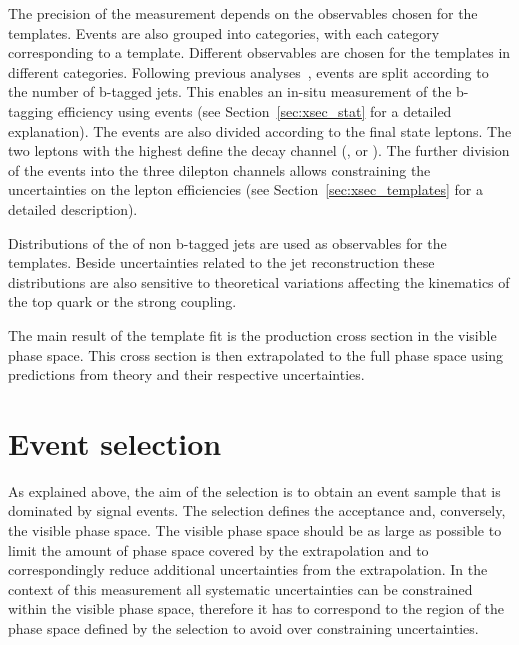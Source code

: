 The precision of the measurement depends on the observables chosen for the templates. Events are also grouped into categories, with each category corresponding to a template. Different observables are chosen for the templates in different categories.
Following previous analyses~\cite{Khachatryan:2016mqs}, events are split according to the number of b-tagged jets. This enables an in-situ measurement of the b-tagging efficiency using \ttbar events (see Section~\ref{sec:xsec_stat} for a detailed explanation).
The events are also divided according to the final state leptons. The two leptons with the highest \pt define the decay channel (\emu, \mumu or \ee). The further division of the events into the three dilepton channels
allows constraining the uncertainties on the lepton efficiencies (see Section~\ref{sec:xsec_templates} for a detailed description).

Distributions of the \pt of non b-tagged jets are used as observables for the templates. Beside uncertainties related to the jet reconstruction these distributions are also sensitive to theoretical variations affecting the kinematics of the top quark or the strong coupling.

The main result of the template fit is the \ttbar production cross section in the visible phase space. This cross section is then extrapolated to the full phase space using predictions from theory and their
respective uncertainties.

\section{Event selection}
\label{sec:xsec_sel}

As explained above, the aim of the selection is to obtain an event sample that is dominated by signal events. The selection defines the acceptance and, conversely, the visible phase space. 
The visible phase space should be as large as possible to limit the amount of phase space covered by the extrapolation and to correspondingly reduce additional uncertainties from the extrapolation. 
In the context of this measurement all systematic uncertainties can be constrained within the visible phase space, therefore it has to correspond to the region of the phase space defined by the selection to avoid over constraining
uncertainties. 


